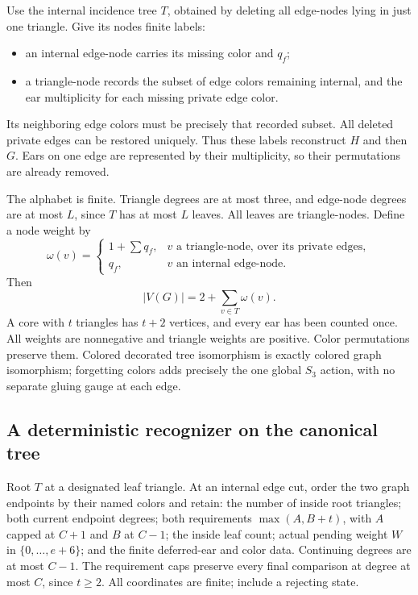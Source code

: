 Use the internal incidence tree $T$, obtained by deleting all
edge-nodes lying in just one triangle.  Give its nodes finite labels:
\begin{itemize}
\item an internal edge-node carries its missing color and $q_f$;
\item a triangle-node records the subset of edge colors remaining
internal, and the ear multiplicity for each missing private edge
color.
\end{itemize}
Its neighboring edge colors must be precisely that recorded subset.
All deleted private edges can be restored uniquely.  Thus these
labels reconstruct $H$ and then $G$.  Ears on one edge are represented
by their multiplicity, so their permutations are already removed.

The alphabet is finite.  Triangle degrees are at most three, and
edge-node degrees are at most $L$, since $T$ has at most $L$ leaves.
All leaves are triangle-nodes.  Define a node weight by
\[
 \omega(v)=
 \begin{cases}
 1+\sum q_f,&v\text{ a triangle-node, over its private edges},\\
 q_f,&v\text{ an internal edge-node}.
 \end{cases}
\]
Then
\begin{equation}
 |V(G)|=2+\sum_{v\in T}\omega(v).
 \label{eq:rational-node-weight}
\end{equation}
A core with $t$ triangles has $t+2$ vertices, and every ear has been
counted once.  All weights are nonnegative and triangle weights
are positive.  Color permutations preserve them.  Colored decorated
tree isomorphism is exactly colored graph isomorphism; forgetting
colors adds precisely the one global $S_3$ action, with no separate
gluing gauge at each edge.

\subsection{A deterministic recognizer on the canonical tree}

Root $T$ at a designated leaf triangle.  At an internal edge cut,
order the two graph endpoints by their named colors and retain:
the number of inside root triangles; both current endpoint degrees;
both requirements $\max(A,B+t)$, with $A$ capped at $C+1$ and $B$
at $C-1$; the inside leaf count; actual pending weight $W$ in
$\{0,\ldots,e+6\}$; and the finite deferred-ear and color data.
Continuing degrees are at most $C-1$.  The requirement caps preserve
every final comparison at degree at most $C$, since $t\ge2$.
All coordinates are finite; include a rejecting state.

